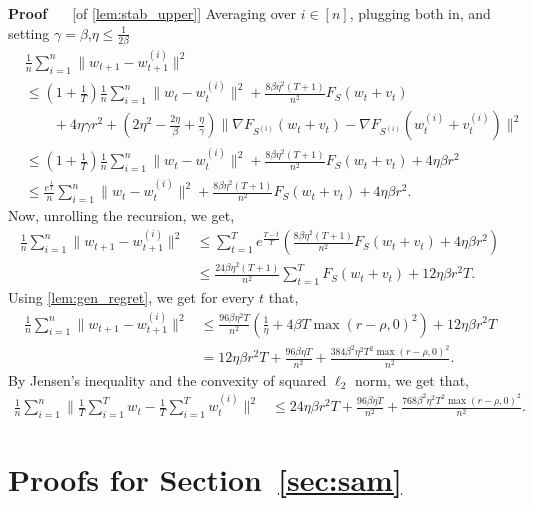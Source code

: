 \documentclass[11pt]{article}
\newcommand{\rad}{r}
\renewenvironment{proof}[1][]{%
  \par\noindent\textbf{\upshape Proof%
  \if\relax\detokenize{#1}\relax\else\ #1\fi}\ %
}{\jmlrQED}
\begin{document}
\begin{proof} [of \cref{lem:stab_upper}]
Averaging over $i\in [n]$, plugging both in, and setting $\gamma = \beta$,$\eta \leq \frac{1}{2\beta}$
\begin{align*}
    &\frac{1}{n}\sum_{i=1}^n\|w_{t+1} - w_{t+1}^{(i)}\|^2 \\&\leq \left(1+\frac{1}{T}\right)\frac{1}{n}\sum_{i=1}^n\|w_{t} - w_{t}^{(i)}\|^2 + \frac{8\beta\eta^2 (T+1)}{n^2} F_S(w_t+v_t)  \\&\qquad+ 4\eta \gamma \rad  ^2+ (2\eta^2 -\frac{2\eta}{\beta} +\frac{\eta}{\gamma}) \| \nabla F_{S^{(i)}}(w_t + v_t) - \nabla F_{S^{(i)}}(w_t^{(i)}+v_t^{(i)})\|^2  
    \\&\leq \left(1+\frac{1}{T}\right)\frac{1}{n}\sum_{i=1}^n\|w_{t} - w_{t}^{(i)}\|^2 + \frac{8\beta\eta^2 (T+1)}{n^2} F_S(w_t+v_t) + 4\eta \beta \rad  ^2
    \\&\leq \frac{e^\frac{1}{T}}{n}\sum_{i=1}^n\|w_{t} - w_{t}^{(i)}\|^2 + \frac{8\beta\eta^2 (T+1)}{n^2} F_S(w_t+v_t) + 4\eta \beta \rad  ^2.
\end{align*}
Now, unrolling the recursion, we get,
\begin{align*}
    \frac{1}{n}\sum_{i=1}^n\|w_{t+1} - w_{t+1}^{(i)}\|^2&\leq \sum_{t=1}^{T} e^{\frac{T-t}{T}} \left( \frac{8\beta\eta^2 (T+1)}{n^2} F_S(w_t+v_t) + 4\eta \beta \rad  ^2\right)
    \\&\leq   \frac{24\beta\eta^2 (T+1)}{n^2} \sum_{t=1}^{T}F_S(w_t+v_t)+ 12\eta \beta \rad  ^2 T.
    \end{align*}
Using \cref{lem:gen_regret}, we get for every $t$ that,
\begin{align*}
     \frac{1}{n}\sum_{i=1}^n\|w_{t+1} - w_{t+1}^{(i)}\|^2&\leq \frac{96\beta\eta^2 T}{n^2} \left(\frac{1}{\eta} + 4 \beta T \max(\rad-\rho,0)^2\right)  +12\eta \beta \rad  ^2 T
     \\&= 12\eta \beta \rad  ^2  T+ \frac{96\beta\eta T}{n^2} + \frac{384\beta^2\eta^2 T^2 \max(\rad-\rho,0)^2}{n^2} .
\end{align*}
By Jensen's inequality and the convexity of squared $\ell_2$ norm, we get that,
\begin{align*}
     \frac{1}{n}\sum_{i=1}^n\|\frac{1}{T}\sum_{i=1}^T w_{t} - \frac{1}{T}\sum_{i=1}^T w_{t}^{(i)}\|^2&\leq  24\eta \beta \rad  ^2  T+ \frac{96\beta\eta T}{n^2} + \frac{768\beta^2\eta^2 T^2 \max(\rad-\rho,0)^2}{n^2} .
\end{align*}
\end{proof}


\section{Proofs for Section~\ref{sec:sam}}\label{sec:proof_sam}
\end{document}
